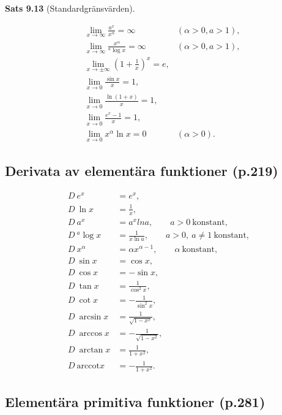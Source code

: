 \documentclass[11pt]{article}
\begin{document}
\textbf{Sats 9.13} (Standardgränsvärden).

\begin{align}
    &\lim_{x \to \infty} \frac{a^x}{x^\alpha} = \infty \quad &(\alpha > 0, a > 1),\\
    &\lim_{x \to \infty} \frac{x^\alpha}{{}^a\log x} = \infty \quad &(\alpha > 0, a > 1),\\
    &\lim_{x \to \pm \infty} \left( 1 + \frac{1}{x} \right)^x = e,\\
    &\lim_{x \to 0} \frac{\sin x}{x} = 1,\\
    &\lim_{x \to 0} \frac{\ln(1 + x)}{x} = 1,\\
    &\lim_{x \to 0} \frac{e^x - 1}{x} = 1,\\
    &\lim_{x \to 0} x^\alpha \ln x = 0 \quad &(\alpha > 0).
\end{align}

\newpage
\subsection{Derivata av elementära funktioner (p.219)}

\begin{align}
    D\ e^x &= e^x,\\
    D\ \ln x &= \frac{1}{x},\\
    D\ a^x &= a^x ln a, \qquad a > 0\ \mathrm{konstant},\\
    D\ {}^{a}\log x &= \frac{1}{x \ln a}, \qquad a > 0,\ a \neq 1\ \mathrm{konstant},\\
    D\ x^\alpha &= \alpha x^{\alpha - 1}, \qquad \alpha\ \mathrm{konstant},\\
    D\ \sin x &= \cos x,\\
    D\ \cos x &= -\sin x,\\
    D\ \tan x &= \frac{1}{\cos^2 x},\\
    D\ \cot x &= -\frac{1}{\sin^2 x},\\
    D\ \arcsin x &= \frac{1}{\sqrt{1 - x^x}},\\
    D\ \arccos x &= -\frac{1}{\sqrt{1 - x^2}},\\
    D\ \arctan x &= \frac{1}{1 + x^2},\\
    D\ \mathrm{arccot} x &= -\frac{1}{1 + x^2}.
\end{align}

\subsection{Elementära primitiva funktioner (p.281)}
\end{document}
